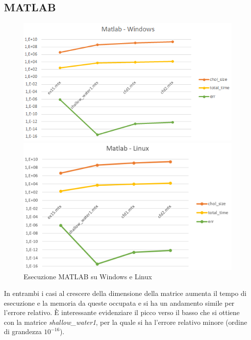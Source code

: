 \documentclass[a4paper,12pt]{article}
\begin{document}
\subsection{MATLAB}
\begin{figure}[H]
\centering%
\begin{minipage}{0.5\textwidth}
  \includegraphics[width=1\linewidth]{img/matlabwin.png}
\end{minipage}%
\begin{minipage}{0.5\textwidth}\centering
  \includegraphics[width=1\linewidth]{img/matlablinux.png}
\end{minipage}%
  
\caption{Esecuzione MATLAB su Windows e Linux}
\end{figure}

\bigskip

\fancyhf{}
\rhead{\leftmark}
\fancyfoot[C]{\thepage}

In entrambi i casi al crescere della dimensione della matrice aumenta il tempo di esecuzione e la memoria da queste occupata e si ha un andamento simile per l’errore relativo. È interessante evidenziare il picco verso il basso che si ottiene con la matrice \textit{shallow\_water1}, per la quale si ha l’errore relativo minore (ordine di grandezza $10^{-16}$).
\bigskip
\end{document}
